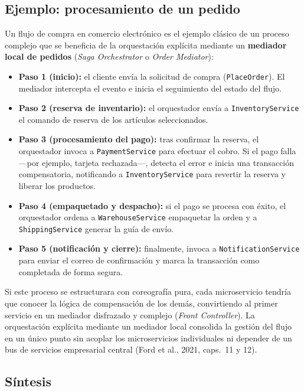 \documentclass[12pt,a4paper]{article}
\begin{document}
\subsection{Ejemplo: procesamiento de un pedido}

Un flujo de compra en comercio electrónico es el ejemplo clásico de un proceso complejo que se beneficia de la orquestación explícita mediante un \textbf{mediador local de pedidos} (\emph{Saga Orchestrator} o \emph{Order Mediator}):

\begin{itemize}[label=$\cdot$]
  \item \textbf{Paso 1 (inicio):} el cliente envía la solicitud de compra (\texttt{PlaceOrder}). El mediador intercepta el evento e inicia el seguimiento del estado del flujo.
  \item \textbf{Paso 2 (reserva de inventario):} el orquestador envía a \texttt{InventoryService} el comando de reserva de los artículos seleccionados.
  \item \textbf{Paso 3 (procesamiento del pago):} tras confirmar la reserva, el orquestador invoca a \texttt{PaymentService} para efectuar el cobro. Si el pago falla ---por ejemplo, tarjeta rechazada---, detecta el error e inicia una transacción compensatoria, notificando a \texttt{InventoryService} para revertir la reserva y liberar los productos.
  \item \textbf{Paso 4 (empaquetado y despacho):} si el pago se procesa con éxito, el orquestador ordena a \texttt{WarehouseService} empaquetar la orden y a \texttt{ShippingService} generar la guía de envío.
  \item \textbf{Paso 5 (notificación y cierre):} finalmente, invoca a \texttt{NotificationService} para enviar el correo de confirmación y marca la transacción como completada de forma segura.
\end{itemize}

Si este proceso se estructurara con coreografía pura, cada microservicio tendría que conocer la lógica de compensación de los demás, convirtiendo al primer servicio en un mediador disfrazado y complejo (\emph{Front Controller}). La orquestación explícita mediante un mediador local consolida la gestión del flujo en un único punto sin acoplar los microservicios individuales ni depender de un bus de servicios empresarial central (Ford et al., 2021, caps.~11 y 12).

\subsection{Síntesis}
\end{document}
